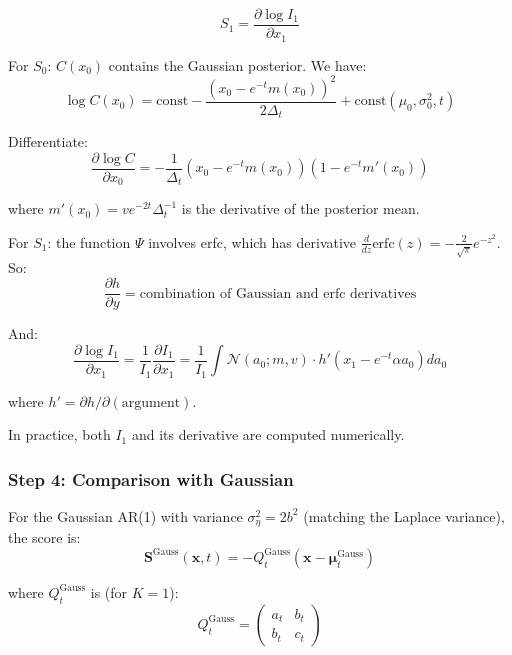 \documentclass[11pt,a4paper]{article}
\theoremstyle{plain}
\theoremstyle{definition}
\newcommand{\Prec}{Q}
\newcommand{\delt}{\Delta_t}
\newcommand{\vct}[1]{\mathbf{#1}}
\begin{document}
\begin{equation}
S_1 = \frac{\partial \log I_1}{\partial x_1}
\end{equation}

For $S_0$: $C(x_0)$ contains the Gaussian posterior. We have:
\begin{equation}
\log C(x_0) = \text{const} - \frac{(x_0 - e^{-t}m(x_0))^2}{2\delt} + \text{const}(\mu_0, \sigma_0^2, t)
\end{equation}

Differentiate:
\begin{equation}
\frac{\partial \log C}{\partial x_0} = -\frac{1}{\delt}(x_0 - e^{-t}m(x_0))(1 - e^{-t}m'(x_0))
\end{equation}

where $m'(x_0) = v e^{-2t}\delt^{-1}$ is the derivative of the posterior mean.

For $S_1$: the function $\Psi$ involves erfc, which has derivative $\frac{d}{dz}\text{erfc}(z) = -\frac{2}{\sqrt{\pi}}e^{-z^2}$. So:
\begin{equation}
\frac{\partial h}{\partial y} = \text{combination of Gaussian and erfc derivatives}
\end{equation}

And:
\begin{equation}
\frac{\partial \log I_1}{\partial x_1} = \frac{1}{I_1}\frac{\partial I_1}{\partial x_1} = \frac{1}{I_1}\int \mathcal{N}(a_0; m, v) \cdot h'(x_1 - e^{-t}\alpha a_0) da_0
\end{equation}

where $h' = \partial h/\partial (\text{argument})$.

In practice, both $I_1$ and its derivative are computed numerically.

\subsubsection{Step 4: Comparison with Gaussian}

For the Gaussian AR(1) with variance $\sigma_\eta^2 = 2b^2$ (matching the Laplace variance), the score is:
\begin{equation}
\vct{S}^{\text{Gauss}}(\vct{x}, t) = -\Prec_t^{\text{Gauss}} (\vct{x} - \boldsymbol{\mu}_t^{\text{Gauss}})
\end{equation}

where $\Prec_t^{\text{Gauss}}$ is (for $K=1$):
\begin{equation}
\Prec_t^{\text{Gauss}} = \begin{pmatrix} a_t & b_t \\ b_t & c_t \end{pmatrix}
\end{equation}
\end{document}
